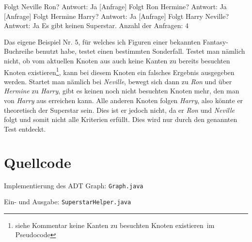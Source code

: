 \documentclass[a4paper, notitlepage, 12pt]{scrartcl}
\newenvironment{longlisting}{\captionsetup{type=listing}}{}
\begin{document}
   \begin{MyVerbatim}
 [Anfrage] Folgt Neville Ron? Antwort: Ja
 [Anfrage] Folgt Ron Hermine? Antwort: Ja
 [Anfrage] Folgt Hermine Harry? Antwort: Ja
 [Anfrage] Folgt Harry Neville? Antwort: Ja
 Es gibt keinen Superstar.
 Anzahl der Anfragen: 4
   \end{MyVerbatim}

Das eigene Beispiel Nr. 5, für welches ich Figuren einer bekannten Fantasy-Buchreihe benutzt habe, testet einen bestimmten Sonderfall. Testet man nämlich nicht, ob vom aktuellen Knoten aus auch keine Kanten zu bereits besuchten Knoten existieren\footnote{siehe Kommentar \glqq keine Kanten zu besuchten Knoten existieren\grqq ~im Pseudocode}, kann bei diesem Knoten ein falsches Ergebnis ausgegeben werden. Startet man nämlich bei \textit{Neville}, bewegt sich dann zu \textit{Ron} und über \textit{Hermine} zu \textit{Harry}, gibt es keinen noch nicht besuchten Knoten mehr, den man von \textit{Harry} aus erreichen kann. Alle anderen Knoten folgen \textit{Harry}, also könnte er theoretisch der Superstar sein. Dies ist er jedoch nicht, da er \textit{Ron} und \textit{Neville} folgt und somit nicht alle Kriterien erfüllt. Dies wird nur durch den genannten Test entdeckt.

\section{Quellcode}
 \renewcommand{\listingscaption}{Quellcode}

 \begin{longlisting}
 \caption{Implementierung des ADT Graph: \texttt{Graph.java}}
 \end{longlisting}

 \begin{longlisting}
 \caption{Ein- und Ausgabe: \texttt{SuperstarHelper.java}}
 \end{longlisting}

 
\end{document}
